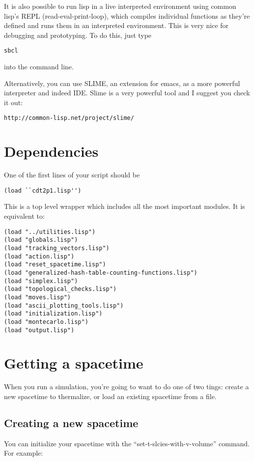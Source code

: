 \documentclass{article}
\begin{document}
It is also possible to run lisp in a live interpreted environment
using common lisp's REPL (read-eval-print-loop), which compiles
individual functions as they're defined and runs them in an
interpreted environment. This is very nice for debugging and
prototyping. To do this, just type
\begin{lstlisting}
sbcl
\end{lstlisting}
into the command line.

Alternatively, you can use SLIME, an extension for emacs, as a more
powerful interpreter and indeed IDE. Slime is a very powerful tool and
I suggest you check it out:
\begin{verbatim}
http://common-lisp.net/project/slime/
\end{verbatim}

\section{Dependencies}
One of the first lines of your script should be 
\begin{lstlisting}
(load ``cdt2p1.lisp'')
\end{lstlisting}
This is a top level wrapper which includes all the most important
modules. It is equivalent to:
\begin{lstlisting}
(load "../utilities.lisp")
(load "globals.lisp")
(load "tracking_vectors.lisp")
(load "action.lisp")
(load "reset_spacetime.lisp")
(load "generalized-hash-table-counting-functions.lisp")
(load "simplex.lisp")
(load "topological_checks.lisp")
(load "moves.lisp")
(load "ascii_plotting_tools.lisp")
(load "initialization.lisp")
(load "montecarlo.lisp")
(load "output.lisp")
\end{lstlisting}

\section{Getting a spacetime}

When you run a simulation, you're going to want to do one of two
tings: create a new spacetime to thermalize, or load an existing
spacetime from a file.

\subsection{Creating a new spacetime}

You can initialize your spacetime with the
``set-t-slcies-with-v-volume'' command. For example:
\end{document}
